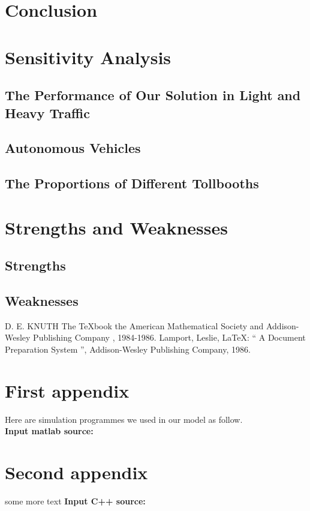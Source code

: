 \documentclass{mcmthesis}
\begin{document}
\section{Conclusion}

\section{Sensitivity Analysis}
\subsection{The Performance of Our Solution in Light
and Heavy Traffic}
\subsection{Autonomous Vehicles}
\subsection{The Proportions of Different Tollbooths}

\section{Strengths and Weaknesses}
\subsection{Strengths}
\subsection{Weaknesses}

\begin{thebibliography}{99}
 D. E. KNUTH   The \TeX{}book  the American
Mathematical Society and Addison-Wesley
Publishing Company , 1984-1986.
Lamport, Leslie,  \LaTeX{}: `` A Document Preparation System '',
Addison-Wesley Publishing Company, 1986.

\end{thebibliography}

\begin{appendices}

\section{First appendix}


Here are simulation programmes we used in our model as follow.\\

\textbf{\textcolor[rgb]{0.98,0.00,0.00}{Input matlab source:}}


\section{Second appendix}

some more text \textcolor[rgb]{0.98,0.00,0.00}{\textbf{Input C++ source:}}


\end{appendices}
\end{document}
